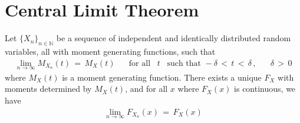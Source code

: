 \section{Central Limit Theorem}

\begin{theorem}
    Let $\{X_{n}\}_{n \in \mathbb{N}}$ be a sequence of independent and identically distributed random variables, all with moment generating functions, such that
    \begin{align*}
        \lim_{n \longrightarrow \infty} M_{X_{n}}(t) \hspace{2pt} = \hspace{2pt} M_{X}(t) \hspace{20pt} \text{for all} \hspace{10pt} t \hspace{10pt} \text{such that} \hspace{4pt} -\delta \hspace{2pt} < \hspace{2pt} t \hspace{2pt} < \hspace{2pt} \delta \hspace{2pt} , \hspace{20pt} \delta \hspace{2pt} > \hspace{2pt} 0
    \end{align*}
    where $M_{X}(t)$ is a moment generating function. There exists a unique $F_{X}$ with moments determined by $M_{X}(t)$, and for all $x$ where $F_{X}(x)$ is continuous, we have
    \begin{align*}
        \lim_{n \longrightarrow \infty} F_{X_{n}}(x) \hspace{2pt} = \hspace{2pt} F_{X}(x)
    \end{align*}
\end{theorem}

